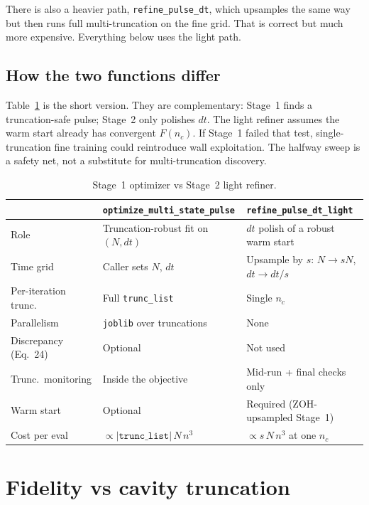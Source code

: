 \documentclass[11pt]{article}
\begin{document}
There is also a heavier path, \texttt{refine\_pulse\_dt}, which upsamples
the same way but then runs full multi-truncation on the fine grid. That is
correct but much more expensive. Everything below uses the light path.

\subsection{How the two functions differ}

Table~\ref{tab:functions} is the short version. They are complementary:
Stage~1 finds a truncation-safe pulse; Stage~2 only polishes $dt$. The light
refiner assumes the warm start already has convergent $F(n_c)$. If Stage~1
failed that test, single-truncation fine training could reintroduce wall
exploitation. The halfway sweep is a safety net, not a substitute for
multi-truncation discovery.

\begin{table}[h]
\centering
\caption{Stage~1 optimizer vs Stage~2 light refiner.}
\label{tab:functions}
\small
\begin{tabular}{@{}lll@{}}
\toprule
& \texttt{optimize\_multi\_state\_pulse}
& \texttt{refine\_pulse\_dt\_light} \\
\midrule
Role
  & Truncation-robust fit on $(N,dt)$
  & $dt$ polish of a robust warm start \\
Time grid
  & Caller sets $N$, $dt$
  & Upsample by $s$: $N\!\to\!sN$, $dt\!\to\!dt/s$ \\
Per-iteration trunc.
  & Full \texttt{trunc\_list}
  & Single $n_c$ \\
Parallelism
  & \texttt{joblib} over truncations
  & None \\
Discrepancy (Eq.~24)
  & Optional
  & Not used \\
Trunc.\ monitoring
  & Inside the objective
  & Mid-run + final checks only \\
Warm start
  & Optional
  & Required (ZOH-upsampled Stage~1) \\
Cost per eval
  & $\propto |\texttt{trunc\_list}|\,N\,n^3$
  & $\propto s\,N\,n^3$ at one $n_c$ \\
\bottomrule
\end{tabular}
\end{table}


\section{Fidelity vs cavity truncation}
\label{sec:fidelity}
\end{document}
